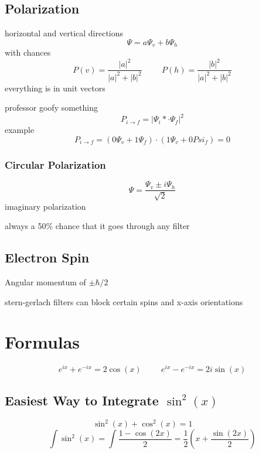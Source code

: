 \documentclass[fleqn]{report}
\newcommand{\hp}{\hspace{1cm}}
\begin{document}
\section{Polarization}
horizontal and vertical directions
\[
\Psi = a \Psi_v + b \Psi_h
\]
with chances
\[
P(v) = \frac{|a|^2}{|a|^2 + |b|^2}
\hp
P(h) = \frac{|b|^2}{|a|^2 + |b|^2}
\]
everything is in unit vectors

professor goofy something
\[
P_{i \to f} = |\Psi_i* \cdot \Psi_f|^2
\]
example
\[
P_{i \to f} = (0 \Psi_v + 1\Psi_f) \cdot (1 \Psi_v + 0Psi_f) = 0
\]


\subsection{Circular Polarization}
\[
\Psi = \frac{\Psi_v \pm i \Psi_h}{\sqrt{2}}
\]
imaginary polarization

always a 50\% chance that it goes through any filter

\section{Electron Spin}
Angular momentum of $\pm \hbar / 2$

stern-gerlach filters can block certain spins and x-axis orientations













\newpage
\chapter{Formulas}
\[
e^{ix} + e^{-ix} = 2 \cos (x)
\hp
e^{ix} - e^{-ix} = 2 i \sin (x)
\]

\section{Easiest Way to Integrate $\sin^2(x)$}
\[
\sin^2 (x) + \cos^2 (x) = 1
\hp
\]
\[
\int \sin^2 (x) = \int \frac{1 - \cos (2x)}{2}
=
\frac{1}{2} \left( x + \frac{\sin(2x)}{2} \right)
\]
\end{document}
